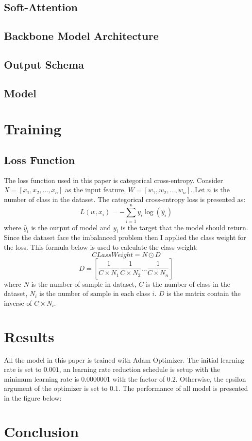\subsection{Soft-Attention}
\subsection{Backbone Model Architecture}
\subsection{Output Schema}
\subsection{Model}

\section{Training}
\subsection{Loss Function}
The loss function used in this paper is categorical cross-entropy. Consider $X = [x_1, x_2, \dots, x_n]$ as the input feature, $W = [w_1, w_2, \dots, w_n]$. Let $n$ is the number of class in the dataset. The categorical cross-entropy loss is presented as:
\[L(w, x_i) = -\sum_{i=1}^{n}y_i\log(\hat{y}_i)\]
where $\hat{y}_i$  is the output of model and $y_i$ is the target that the model should return. \\
Since the dataset face the imbalanced problem then I applied the class weight for the loss. This formula below is used to calculate the class weight:
\[CLassWeight = N \odot D\]
\[D = [\frac{1}{C \times  N_1}  \frac{1}{C \times  N_2}  \dots \frac{1}{C \times  N_n}]\]
where $N$ is the number of sample in dataset, $C$ is the number of class in the dataset, $N_i$ is the number of sample in each class $i$. $D$ is the matrix contain the inverse of $C \times N_i$.

\section{Results}
All the model in this paper is trained with Adam Optimizer\cite{6980}. The initial learning rate is set to $0.001$, an learning rate reduction schedule is setup with the minimum learning rate is $0.0000001$ with the factor of $0.2$. Otherwise, the epsilon argument of the optimizer is set to $0.1$. The performance of all model is presented in the figure below:
\section{Conclusion}
\cite{08332}
\clearpage
\pagebreak
